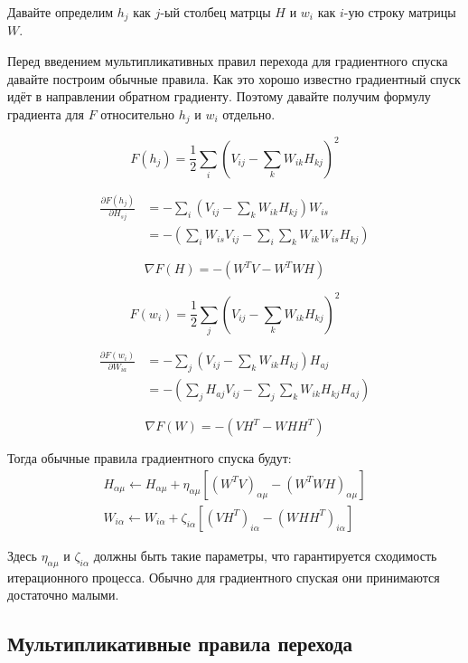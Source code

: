 \documentclass[oneside, final, 14pt]{extarticle}
\begin{document}
Давайте определим $h_j$ как $j$-ый столбец матрцы $H$
и $w_i$ как $i$-ую строку матрицы $W$.

Перед введением мультипликативных правил перехода
для градиентного спуска давайте построим обычные правила.
Как это хорошо известно градиентный спуск идёт в направлении
обратном градиенту. Поэтому давайте получим формулу градиента
для $F$ относительно $h_j$ и $w_i$ отдельно.

\[
  F(h_j) = \frac{1}{2} \sum_{i}
  \left(
    V_{ij} - \sum_{k}W_{ik}H_{kj}
  \right)^2
\]

\begin{align*}
  \frac{\partial F(h_j)}{\partial H_{sj}}
  &=
  - \sum_i
    \left(
      V_{ij} - \sum_k W_{ik}H_{kj}
    \right)
  W_{is} \\
  &=
  -
    \left(
      \sum_i W_{is}V_{ij} - \sum_i\sum_kW_{ik}W_{is}H_{kj}
    \right)
\end{align*}

\[
  \nabla F(H) = - ( W^TV - W^TWH )
\]

\[
  F(w_i) = \frac{1}{2}\sum_j
    \left( V_{ij} - \sum_k W_{ik}H_{kj} \right)^2
\]

\begin{align*}
  \frac{\partial F(w_i)}{\partial W_{ia}}
  &=
  - \sum_j
    \left(
      V_{ij} - \sum_k W_{ik}H_{kj}
    \right)
  H_{aj} \\
  &=
  -
    \left(
      \sum_j H_{aj}V_{ij} - \sum_j \sum_k W_{ik}H_{kj}H_{aj}
    \right)
\end{align*}

\[
  \nabla F(W) = - ( VH^T - WHH^T )
\]

Тогда обычные правила градиентного спуска будут:
\begin{align*}
  H_{\alpha\mu} \leftarrow H_{\alpha\mu} +
  \eta_{\alpha\mu} \left[
     (W^TV)_{\alpha\mu} - (W^TWH)_{\alpha\mu}
  \right] \\
  W_{i\alpha} \leftarrow W_{i\alpha} +
  \zeta_{i\alpha} \left[
    (VH^T)_{i\alpha} - (WHH^T)_{i\alpha}
  \right]
\end{align*}

Здесь $\eta_{\alpha\mu}$ и $\zeta_{i\alpha}$ должны быть
такие параметры, что гарантируется сходимость итерационного
процесса.
Обычно для градиентного спуская они принимаются достаточно малыми.

\subsection{Мультипликативные правила перехода}
\end{document}
